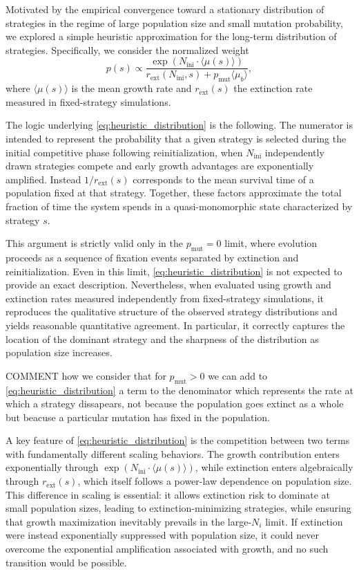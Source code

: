 \documentclass[a4paper,10pt,twocolumn]{article}
\begin{document}
Motivated by the empirical convergence toward a stationary distribution of strategies in the regime of large population size and small mutation probability, we explored a simple heuristic approximation for the long-term distribution of strategies. Specifically, we consider the normalized weight
\begin{equation}
    p(s)\propto\frac{\exp(N_\text{ini}\cdot\langle\mu(s)\rangle)}{r_{\text{ext}}(N_\text{ini},s)+p_\text{mut}\langle\mu_b\rangle},
    \label{eq:heuristic_distribution}
\end{equation}
where $\langle\mu(s)\rangle$ is the mean growth rate and $r_{\text{ext}}(s)$ the extinction rate measured in fixed-strategy simulations.

The logic underlying \autoref{eq:heuristic_distribution} is the following. The numerator is intended to represent the probability that a given strategy is selected during the initial competitive phase following reinitialization, when $N_\text{ini}$ independently drawn strategies compete and early growth advantages are exponentially amplified. Instead $1/r_{\text{ext}}(s)$ corresponds to the mean survival time of a population fixed at that strategy. Together, these factors approximate the total fraction of time the system spends in a quasi-monomorphic state characterized by strategy $s$.

This argument is strictly valid only in the $p_{\mathrm{mut}}=0$ limit, where evolution proceeds as a sequence of fixation events separated by extinction and reinitialization. Even in this limit, \autoref{eq:heuristic_distribution} is not expected to provide an exact description. Nevertheless, when evaluated using growth and extinction rates measured independently from fixed-strategy simulations, it reproduces the qualitative structure of the observed strategy distributions and yields reasonable quantitative agreement. In particular, it correctly captures the location of the dominant strategy and the sharpness of the distribution as population size increases.

COMMENT how we consider that for $p_\text{mut}>0$ we can add to \autoref{eq:heuristic_distribution} a term to the denominator which represents the rate at which a strategy dissapears, not because the population goes extinct as a whole but beacuse a particular mutation has fixed in the population.

A key feature of \autoref{eq:heuristic_distribution} is the competition between two terms with fundamentally different scaling behaviors. The growth contribution enters exponentially through $\exp(N_\text{ini}\cdot\langle\mu(s)\rangle)$, while extinction enters algebraically through $r_{\text{ext}}(s)$, which itself follows a power-law dependence on population size. This difference in scaling is essential: it allows extinction risk to dominate at small population sizes, leading to extinction-minimizing strategies, while ensuring that growth maximization inevitably prevails in the large-$N_i$ limit. If extinction were instead exponentially suppressed with population size, it could never overcome the exponential amplification associated with growth, and no such transition would be possible.
\end{document}
